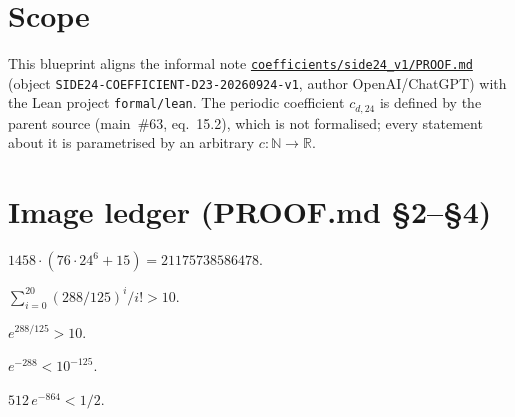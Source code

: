 
\chapter{Scope}

This blueprint aligns the informal note
\href{https://github.com/d6g8k5htny-coder/Math-/blob/760340e921ac4ceda296b8118da936f1133e956e/coefficients/side24_v1/PROOF.md}{\texttt{coefficients/side24\_v1/PROOF.md}}
(object \texttt{SIDE24-COEFFICIENT-D23-20260924-v1}, author OpenAI/ChatGPT) with the Lean
project \texttt{formal/lean}. The periodic coefficient $c_{d,24}$ is defined by the parent
source (main~\#63, eq.~15.2), which is not formalised; every statement about it is
parametrised by an arbitrary $c:\mathbb N\to\mathbb R$.

\chapter{Image ledger (PROOF.md \S2--\S4)}

\begin{lemma}\label{lem:image-constant}\leanok
$1458\cdot(76\cdot 24^6+15)=21175738586478$.
\end{lemma}

\begin{lemma}\label{lem:exp-partial-sum}\leanok
$\sum_{i=0}^{20} (288/125)^i/i! > 10$.
\end{lemma}

\begin{lemma}\label{lem:exp-lower}\leanok{}
$e^{288/125}>10$.
\end{lemma}

\begin{lemma}\label{lem:exp-neg}\leanok{}
$e^{-288}<10^{-125}$.
\end{lemma}

\begin{lemma}\label{lem:ratio}\leanok{}
$512\,e^{-864}<1/2$.
\end{lemma}

